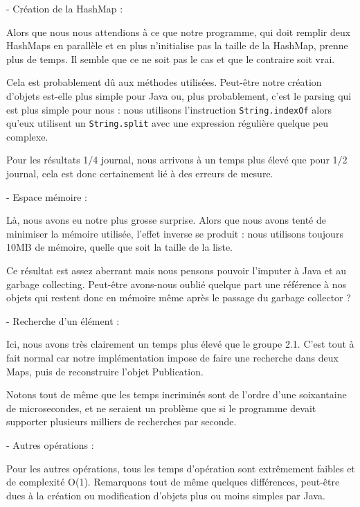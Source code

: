 \documentclass[a4paper,10pt]{article}
\begin{document}
	- Création de la HashMap :
	
	Alors que nous nous attendions à ce que notre programme, qui doit remplir deux HashMaps en parallèle et en plus n'initialise pas la taille de la HashMap, prenne plus de temps. Il semble que ce ne soit pas le cas et que le contraire soit vrai.
	
	Cela est probablement dû aux méthodes utilisées. Peut-être notre création d'objets est-elle plus simple pour Java ou, plus probablement, c'est le parsing qui est plus simple pour nous : nous utilisons l'instruction \texttt{String.indexOf} alors qu'eux utilisent un \texttt{String.split} avec une expression régulière quelque peu complexe.
	
	Pour les résultats 1/4 journal, nous arrivons à un temps plus élevé que pour 1/2 journal, cela est donc certainement lié à des erreurs de mesure.
	
	\vspace{0.4cm}
	- Espace mémoire :
	
	Là, nous avons eu notre plus grosse surprise. Alors que nous avons tenté de minimiser la mémoire utilisée, l'effet inverse se produit : nous utilisons toujours 10MB de mémoire, quelle que soit la taille de la liste.
	
	Ce résultat est assez aberrant mais nous pensons pouvoir l'imputer à Java et au garbage collecting. Peut-être avons-nous oublié quelque part une référence à nos objets qui restent donc en mémoire même après le passage du garbage collector ?
	
	\vspace{0.4cm}
	- Recherche d'un élément :
	
	Ici, nous avons très clairement un temps plus élevé que le groupe 2.1. C'est tout à fait normal car notre implémentation impose de faire une recherche dans deux Maps, puis de reconstruire l'objet Publication.
	
	Notons tout de même que les temps incriminés sont de l'ordre d'une soixantaine de microsecondes, et ne seraient un problème que si le programme devait supporter plusieurs milliers de recherches par seconde.

	\vspace{0.4cm}
	- Autres opérations :
	
	Pour les autres opérations, tous les temps d'opération sont extrêmement faibles et de complexité O(1). Remarquons tout de même quelques différences, peut-être dues à la création ou modification d'objets plus ou moins simples par Java.
\end{document}
